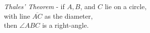 \documentclass[preview]{standalone}
\begin{document}
\begin{center}
\textit{Thales' Theorem} - if $A,B$, and $C$ lie on a circle,\\ with line $\overline{AC}$ as the diameter, \\then $\angle ABC$ is a right-angle.
\end{center}
\end{document}
